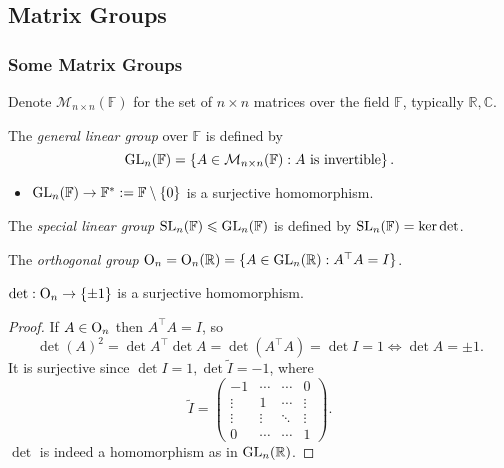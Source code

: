 \documentclass[a4paper]{article}
\begin{document}
    \subsection{Matrix Groups}
    \subsubsection{Some Matrix Groups}
    Denote $ \mathcal{M}_{n\times n}(\mathbb{F}) $ for the set of $ n \times n $ matrices over the field $\mathbb{F}$, typically $\mathbb{R},\mathbb{C}$.

    \begin{definition}
        The \textit{general linear group} over $\mathbb{F}$ is defined by 
        \[
            \mathrm{GL}_n(\mathbb{F})=\left\{ A\in \mathcal{M}_{n\times n}(\mathbb{F}):A \text{ is invertible} \right\}.
        \]
    \end{definition}
    \begin{proposition}
        \begin{itemize}
            \item $ \mathrm{GL}_n(\mathbb{F}) \to \mathbb{F}^*:=\mathbb{F} \setminus \{0\} $ is a surjective homomorphism.
        \end{itemize}
    \end{proposition}
    \begin{definition}
        The \textit{special linear group} $ \mathrm{SL}_n(\mathbb{F}) \leqslant \mathrm{GL}_n(\mathbb{F}) $ is defined by $ \mathrm{SL}_n(\mathbb{F}) = \ker \det $.
    \end{definition}
    \begin{definition}
        The \textit{orthogonal group} $ \mathrm{O}_n=\mathrm{O}_n(\mathbb{R})=\{A\in \mathrm{GL}_n(\mathbb{R}): A^\top A=I\} $.
    \end{definition}
    \begin{proposition}\label{prop:7.4}
        $ \det : \mathrm{O}_n\to \left\{ \pm 1 \right\} $ is a surjective homomorphism.
    \end{proposition}
    \begin{proof}
        If $A\in \mathrm{O}_n$ then $A^\top A=I$, so 
        \[
            \det (A)^2=\det A^\top \det A = \det (A^\top A)=\det I=1 \Longleftrightarrow \det A=\pm 1.
        \] 
        It is surjective since $ \det I=1, \det \tilde{I}=-1 $, where 
        \[
            \tilde{I}=\begin{pmatrix}
                -1&\cdots &\cdots &0\\
                \vdots &1& \cdots &\vdots \\
                \vdots &\vdots &\ddots &\vdots \\
                0&\cdots&\cdots &1
            \end{pmatrix}.
        \]
        $ \det  $ is indeed a homomorphism as in $ \mathrm{GL}_n(\mathbb{R}) $.
    \end{proof}
\end{document}
